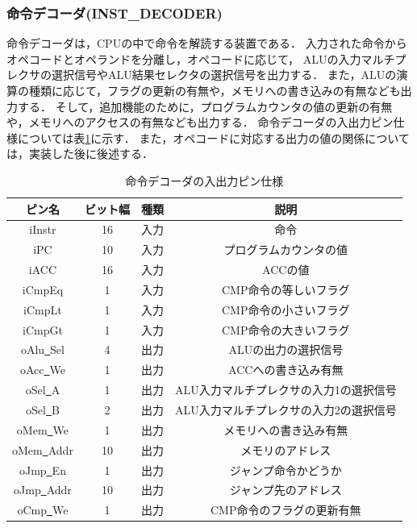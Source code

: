 \documentclass[a4paper,11pt]{ltjsarticle}
\begin{document}
\subsubsection{命令デコーダ(INST\_DECODER)}
命令デコーダは，CPUの中で命令を解読する装置である．
入力された命令からオペコードとオペランドを分離し，オペコードに応じて，
ALUの入力マルチプレクサの選択信号やALU結果セレクタの選択信号を出力する．
また，ALUの演算の種類に応じて，フラグの更新の有無や，メモリへの書き込みの有無なども出力する．
そして，追加機能のために，プログラムカウンタの値の更新の有無や，メモリへのアクセスの有無なども出力する．
命令デコーダの入出力ピン仕様については表\ref{tab:inst_decoder}に示す．
また，オペコードに対応する出力の値の関係については，実装した後に後述する．
\begin{table}[H]
    \centering
    \caption{命令デコーダの入出力ピン仕様}
    \label{tab:inst_decoder}
    \begin{tabular}{|c|c|c|c|}
        \hline
        ピン名                   & ビット幅 & 種類 & 説明                    \\
        \hline
        iInstr                & 16   & 入力 & 命令                    \\
        \hline
        iPC                   & 10   & 入力 & プログラムカウンタの値           \\
        \hline
        iACC                  & 16   & 入力 & ACCの値                 \\
        \hline
        iCmpEq                & 1    & 入力 & CMP命令の等しいフラグ          \\
        \hline
        iCmpLt                & 1    & 入力 & CMP命令の小さいフラグ          \\
        \hline
        iCmpGt                & 1    & 入力 & CMP命令の大きいフラグ          \\
        \hline
        oAlu\underline{~}Sel  & 4    & 出力 & ALUの出力の選択信号           \\
        \hline
        oAcc\underline{~}We   & 1    & 出力 & ACCへの書き込み有無           \\
        \hline
        oSel\underline{~}A    & 1    & 出力 & ALU入力マルチプレクサの入力1の選択信号 \\
        \hline
        oSel\underline{~}B    & 2    & 出力 & ALU入力マルチプレクサの入力2の選択信号 \\
        \hline
        oMem\underline{~}We   & 1    & 出力 & メモリへの書き込み有無           \\
        \hline
        oMem\underline{~}Addr & 10   & 出力 & メモリのアドレス              \\
        \hline
        oJmp\underline{~}En   & 1    & 出力 & ジャンプ命令かどうか            \\
        \hline
        oJmp\underline{~}Addr & 10   & 出力 & ジャンプ先のアドレス            \\
        \hline
        oCmp\underline{~}We   & 1    & 出力 & CMP命令のフラグの更新有無        \\
        \hline
    \end{tabular}
\end{table}
\end{document}
